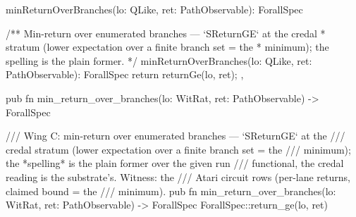 \begin{tssrc}
minReturnOverBranches(lo: QLike, ret: PathObservable): ForallSpec
\end{tssrc}
\begin{tssrc}
/** Min-return over enumerated branches — `SReturnGE` at the credal
 * stratum (lower expectation over a finite branch set = the
 * minimum); the spelling is the plain former. */
minReturnOverBranches(lo: QLike, ret: PathObservable): ForallSpec {
  return returnGe(lo, ret);
},
\end{tssrc}
\begin{rustsrc}
pub fn min_return_over_branches(lo: WitRat, ret: PathObservable) -> ForallSpec
\end{rustsrc}
\begin{rustsrc}
/// Wing C: min-return over enumerated branches — `SReturnGE` at the
/// credal stratum (lower expectation over a finite branch set = the
/// minimum); the *spelling* is the plain former over the given run
/// functional, the credal reading is the substrate's. Witness: the
/// Atari circuit rows (per-lane returns, claimed bound = the
/// minimum).
pub fn min_return_over_branches(lo: WitRat, ret: PathObservable) -> ForallSpec {
    ForallSpec::return_ge(lo, ret)
}
\end{rustsrc}

